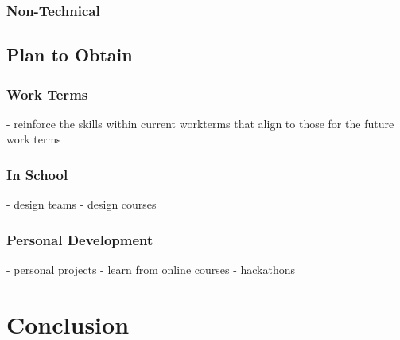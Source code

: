 \documentclass[10pt,letterpaper]{article}
\begin{document}
\subsubsection{Non-Technical}

\subsection{Plan to Obtain}

\subsubsection{Work Terms}
- reinforce the skills within current workterms that align to those for the future work terms

\subsubsection{In School}
- design teams
- design courses

\subsubsection{Personal Development}
- personal projects
- learn from online courses
- hackathons

\clearpage
{}
\section*{Conclusion}\label{conclusion}

\clearpage
{}


\end{document}
